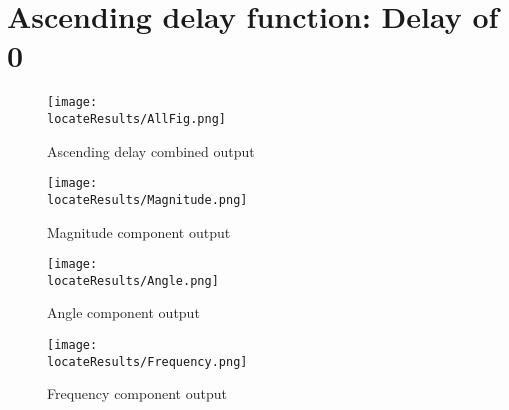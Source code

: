 \newpage
\section{Ascending delay function: Delay of 0}

\begin{figure}[hb]
    \texttt{[image: \\locateResults/AllFig.png]}    
    \caption{Ascending delay combined output}
    \label{fig:PMUsim-Asc0-allfig}
\end{figure}


     \begin{figure}
 
    \texttt{[image: \\locateResults/Magnitude.png]}    
         \label{fig:PMUsim-Asc0Mag}
        \caption{Magnitude component output}
 
\end{figure}

     \begin{figure}
 
   \texttt{[image: \\locateResults/Angle.png]}    
         \label{fig:PMUsim-Asc0Ang}
        \caption{Angle component output}
 
\end{figure}

     \begin{figure}
 
   \texttt{[image: \\locateResults/Frequency.png]}    
         \label{fig:PMUsim-Asc0Freq}
        \caption{Frequency component output}
 
\end{figure}


